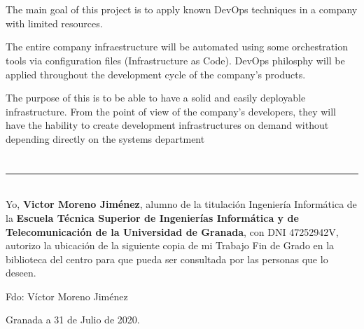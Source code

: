 \\

\vspace{0.7cm}
\\

The main goal of this project is to apply known DevOps techniques in a company with limited resources.\bigskip

The entire company infraestructure will be automated using some orchestration tools via configuration files (Infrastructure as Code). DevOps philosphy will be applied throughout the development cycle of the company's products. \bigskip

The purpose of this is to be able to have a solid and easily deployable infrastructure. From the point of view of the company's developers, they will have the hability to create development infrastructures on demand without depending directly on the systems department \bigskip



\chapter*{}
\thispagestyle{empty}

\noindent\rule[-1ex]{\textwidth}{2pt}\\[4.5ex]

Yo, \textbf{Victor Moreno Jiménez}, alumno de la titulación Ingeniería Informática de la \textbf{Escuela Técnica Superior
de Ingenierías Informática y de Telecomunicación de la Universidad de Granada}, con DNI 47252942V, autorizo la
ubicación de la siguiente copia de mi Trabajo Fin de Grado en la biblioteca del centro para que pueda ser
consultada por las personas que lo deseen.

\vspace{6cm}

\noindent Fdo: Víctor Moreno Jiménez

\vspace{2cm}

\begin{flushright}
Granada a 31 de Julio de 2020.
\end{flushright}


\chapter*{}
\thispagestyle{empty}

